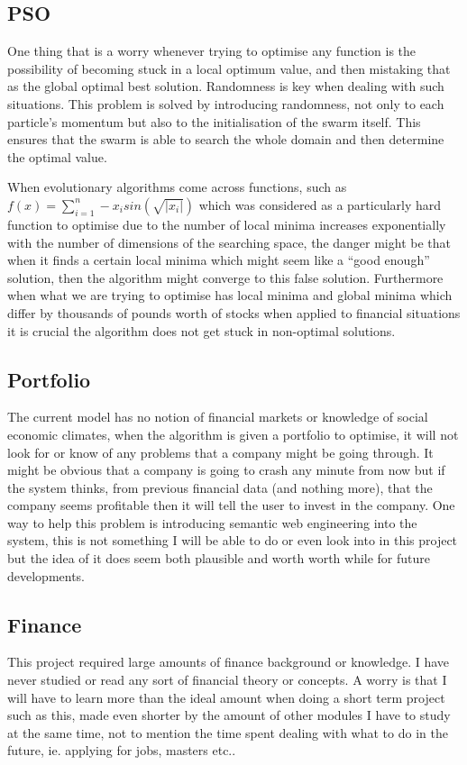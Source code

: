     \subsection{PSO} %
    \label{sub:pso}
      One thing that is a worry whenever trying to optimise any function is the possibility of becoming stuck in a local optimum value, and then mistaking that as the global optimal best solution. Randomness is key when dealing with such situations. This problem is solved by introducing randomness, not only to each particle's momentum but also to the initialisation of the swarm itself. This ensures that the swarm is able to search the whole domain and then determine the optimal value.

      When evolutionary algorithms come across functions, such as $f(x)=\sum\limits_{i=1}^n -x_i sin(\sqrt{|x_i|})$ which was considered \cite{localmin} as a particularly hard function to optimise due to the number of local minima increases exponentially with the number of dimensions of the searching space, the danger might be that when it finds a certain local minima which might seem like a ``good enough'' solution, then the algorithm might converge to this false solution. Furthermore when what we are trying to optimise has local minima and global minima which differ by thousands of pounds worth of stocks when applied to financial situations it is crucial the algorithm does not get stuck in non-optimal solutions. 
    \subsection{Portfolio} %
    \label{sub:portfolio}
      The current model has no notion of financial markets or knowledge of social economic climates, when the algorithm is given a portfolio to optimise, it will not look for or know of any problems that a company might be going through. It might be obvious that a company is going to crash any minute from now but if the system thinks, from previous financial data (and nothing more), that the company seems profitable then it will tell the user to invest in the company. One way to help this problem is introducing semantic web engineering into the system, this is not something I will be able to do or even look into in this project but the idea of it does seem both plausible and worth worth while for future developments.
    \subsection{Finance} %
    \label{sub:finance}
      This project required large amounts of finance background or knowledge. I have never studied or read any sort of financial theory or concepts. A worry is that I will have to learn more than the ideal amount when doing a short term project such as this, made even shorter by the amount of other modules I have to study at the same time, not to mention the time spent dealing with what to do in the future, ie. applying for jobs, masters etc.. 

